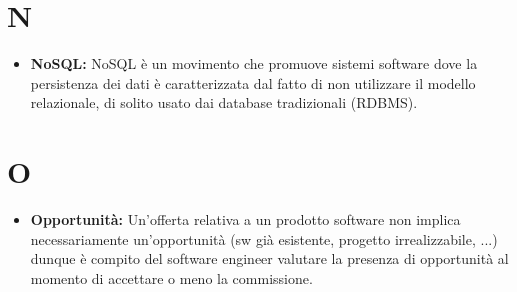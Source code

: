 \documentclass[a4paper]{article}
\begin{document}
	\section*{N}
	\begin{itemize}
		\item \textbf{NoSQL:} NoSQL è un movimento che promuove sistemi software dove la persistenza dei dati è caratterizzata dal fatto di non utilizzare il modello relazionale, di solito usato dai database tradizionali (RDBMS).
	\end{itemize}
		
	\section*{O}
		\begin{itemize}	
			\item \textbf{Opportunità:} Un’offerta relativa a un prodotto software non implica necessariamente un’opportunità 
			(sw già esistente, progetto irrealizzabile, ...) dunque è compito del software engineer valutare la presenza di 
			opportunità al momento di accettare o meno la commissione.	
		\end{itemize}
		
\end{document}
